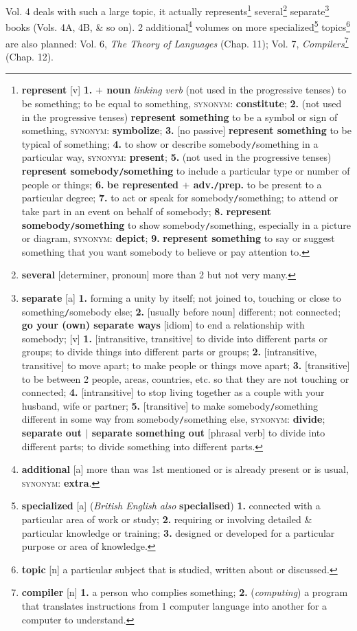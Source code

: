 \documentclass[oneside]{book}
\numberwithin{equation}{section}
\begin{document}
Vol. 4 deals with such a large topic, it actually represents\footnote{\textbf{represent} [v] \textbf{1.} \textbf{$+$ noun} \textit{linking verb} (not used in the progressive tenses) to be something; to be equal to something, \textsc{synonym}: \textbf{constitute}; \textbf{2.} (not used in the progressive tenses) \textbf{represent something} to be a symbol or sign of something, \textsc{synonym}: \textbf{symbolize}; \textbf{3.} [no passive] \textbf{represent something} to be typical of something; \textbf{4.} to show or describe somebody\texttt{/}something in a particular way, \textsc{synonym}: \textbf{present}; \textbf{5.} (not used in the progressive tenses) \textbf{represent somebody\texttt{/}something} to include a particular type or number of people or things; \textbf{6.} \textbf{be represented $+$ adv.\texttt{/}prep.} to be present to a particular degree; \textbf{7.} to act or speak for somebody\texttt{/}something; to attend or take part in an event on behalf of somebody; \textbf{8.} \textbf{represent somebody\texttt{/}something} to show somebody\texttt{/}something, especially in a picture or diagram, \textsc{synonym}: \textbf{depict}; \textbf{9.} \textbf{represent something} to say or suggest something that you want somebody to believe or pay attention to.} several\footnote{\textbf{several} [determiner, pronoun] more than 2 but not very many.} separate\footnote{\textbf{separate} [a] \textbf{1.} forming a unity by itself; not joined to, touching or close to something\texttt{/}somebody else; \textbf{2.} [usually before noun] different; not connected; \textbf{go your (own) separate ways} [idiom] to end a relationship with somebody; [v] \textbf{1.} [intransitive, transitive] to divide into different parts or groups; to divide things into different parts or groups; \textbf{2.} [intransitive, transitive] to move apart; to make people or things move apart; \textbf{3.} [transitive] to be between 2 people, areas, countries, etc. so that they are not touching or connected; \textbf{4.} [intransitive] to stop living together as a couple with your husband, wife or partner; \textbf{5.} [transitive] to make somebody\texttt{/}something different in some way from somebody\texttt{/}something else, \textsc{synonym}: \textbf{divide}; \textbf{separate out $|$ separate something out} [phrasal verb] to divide into different parts; to divide something into different parts.} books (Vols. 4A, 4B, \& so on). 2 additional\footnote{\textbf{additional} [a] more than was 1st mentioned or is already present or is usual, \textsc{synonym}: \textbf{extra}.} volumes on more specialized\footnote{\textbf{specialized} [a] (\textit{British English also} \textbf{specialised}) \textbf{1.} connected with a particular area of work or study; \textbf{2.} requiring or involving detailed \& particular knowledge or training; \textbf{3.} designed or developed for a particular purpose or area of knowledge.} topics\footnote{\textbf{topic} [n] a particular subject that is studied, written about or discussed.} are also planned: Vol. 6, \textit{The Theory of Languages} (Chap. 11); Vol. 7, \textit{Compilers}\footnote{\textbf{compiler} [n] \textbf{1.} a person who complies something; \textbf{2.} (\textit{computing}) a program that translates instructions from 1 computer language into another for a computer to understand.} (Chap. 12).
\end{document}
